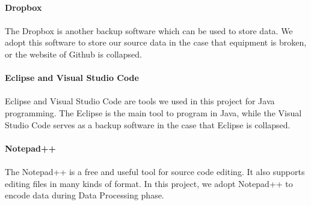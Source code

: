 \paragraph{Dropbox}
\paragraph[]{} The Dropbox is another backup software which can be used to store data. We adopt this software to store our source data in the case that equipment is broken, or the website of Github is collapsed.
\textit{}
\paragraph{Eclipse and Visual Studio Code}
\paragraph[]{} Eclipse and Visual Studio Code are tools we used in this project for Java programming. The Eclipse is the main tool to program in Java, while the Visual Studio Code serves as a backup software in the case that Eclipse is collapsed. 

\paragraph{Notepad++}
\paragraph[]{}The Notepad++ is a free and useful tool for source code editing. It also supports editing files in many kinds of format. In this project, we adopt Notepad++ to encode data during Data Processing phase.

